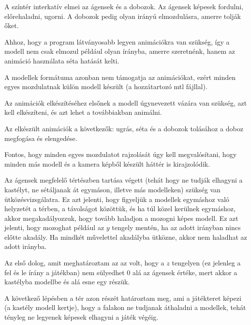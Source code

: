
A színtér interkatív elmei az ágensek és a dobozok. 
Az ágensek képesek fordulni, előrehaladni, ugorni. 
A dobozok pedig olyan irányú elmozdulásra, amerre tolják őket.


Ahhoz, hogy a program látványosabb legyen animációkra van szükség, így a modell nem csak elmozul például olyan írányba, amerre szeretnénk, hanem az animáció használata séta hatását kelti.

A modellek formátuma azonban nem támogatja az animációkat, ezért minden egyes mozdulatnak külön modell készült (a hozzátartozó mtl fájllal).

Az animációk elkészítéséhez elsőnek a modell úgynevezett vázára van szükség, azt kell elkészíteni, és azt lehet a továbbiakban animálni. 
 
Az elkészült animációk a következők: ugrás, séta és a dobozok tolásához a doboz megfogása és elengedése.
 

Fontos, hogy minden egyes mozdulatot rajzolását úgy kell megvalósítani, hogy minden más modell és a kamera képből készült háttér is kirajzolódik.
 

Az ágensek megfelelő tértészben tartása végett (tehát hogy ne tudják elhagyni a kastélyt, ne sétáljanak át egymáson, illetve más modelleken) szükség van ütközésvizsgálatra.
Ez azt jelenti, hogy figyeljük a modellek egymáshoz való helyzetét a térben, a távolságot közöttük, és ha túl közel kerülnek egymáshoz, akkor megakadályozzuk, hogy tovább haladjon a mozogni képes modell.
Ez azt jelenti, hogy  mozoghat  például az $y$ tengely mentén, ha az adott irányban nincs előtte akadály.
Ha mindkét művelettel akadályba ütközne, akkor nem haladhat az adott irányba.
 
Az első dolog, amit meghatároztam az az volt, hogy a $z$ tengelyen (ez jelenleg a fel és le írány a játékban) nem sülyedhet 0 alá az ágensek értéke, mert akkor a kastélyba modellbe és alá esne egy részük.

A következő lépésben a tér azon részét határoztam meg, ami a játékteret képezi (a kastély modell kertje), hogy a falakon ne tudjanak áthaladni a modellek, tehát tényleg ne legyenek képesek elhagyni a játék végéig.

